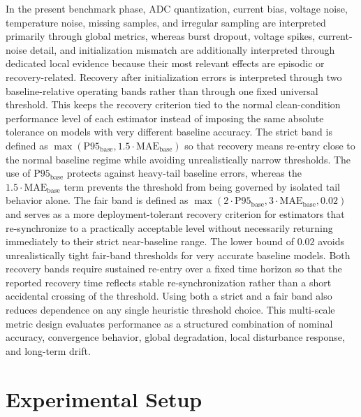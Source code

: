 \documentclass[review,nopreprintline]{elsarticle}
\begin{document}
In the present benchmark phase, ADC quantization, current bias, voltage noise, temperature noise, missing samples, and irregular sampling are interpreted primarily through global metrics, whereas burst dropout, voltage spikes, current-noise detail, and initialization mismatch are additionally interpreted through dedicated local evidence because their most relevant effects are episodic or recovery-related. Recovery after initialization errors is interpreted through two baseline-relative operating bands rather than through one fixed universal threshold. This keeps the recovery criterion tied to the normal clean-condition performance level of each estimator instead of imposing the same absolute tolerance on models with very different baseline accuracy. The strict band is defined as $\max(\mathrm{P95}_{\mathrm{base}},1.5 \cdot \mathrm{MAE}_{\mathrm{base}})$ so that recovery means re-entry close to the normal baseline regime while avoiding unrealistically narrow thresholds. The use of $\mathrm{P95}_{\mathrm{base}}$ protects against heavy-tail baseline errors, whereas the $1.5 \cdot \mathrm{MAE}_{\mathrm{base}}$ term prevents the threshold from being governed by isolated tail behavior alone. The fair band is defined as $\max(2 \cdot \mathrm{P95}_{\mathrm{base}},3 \cdot \mathrm{MAE}_{\mathrm{base}},0.02)$ and serves as a more deployment-tolerant recovery criterion for estimators that re-synchronize to a practically acceptable level without necessarily returning immediately to their strict near-baseline range. The lower bound of $0.02$ avoids unrealistically tight fair-band thresholds for very accurate baseline models. Both recovery bands require sustained re-entry over a fixed time horizon so that the reported recovery time reflects stable re-synchronization rather than a short accidental crossing of the threshold. Using both a strict and a fair band also reduces dependence on any single heuristic threshold choice. This multi-scale metric design evaluates performance as a structured combination of nominal accuracy, convergence behavior, global degradation, local disturbance response, and long-term drift.

\section{Experimental Setup}
\end{document}

